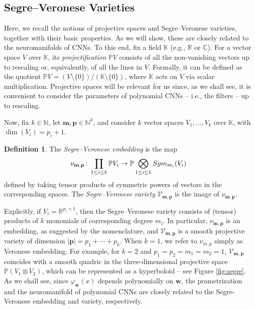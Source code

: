 \documentclass[twoside]{article}
\theoremstyle{plain}%
\theoremstyle{definition}
\newtheorem{defn}{Definition}
\theoremstyle{remark}
\newcommand{\symmm}[2]{\textnormal{Sym}_{#1}(#2)}
\begin{document}
\subsection{Segre--Veronese Varieties}
Here, we recall the notions of projective spaces and Segre--Veronese varieties, together with their basic properties. As we will show, these are closely related to the neuromanifolds of CNNs. To this end, fix a field $\mathbb{K}$ (e.g., $\mathbb{R}$ or $\mathbb{C}$). For a vector space $V$ over $\mathbb{K}$, its \emph{projectification} $\mathbb{P} V$ consists of all the non-vanishing vectors up to rescaling or, equivalently, of all the lines
in $V$. Formally, it can be defined as the quotient $\mathbb{P} V =(V \setminus \{ 0\}) / (\mathbb{K} \setminus \{ 0\})$, where $\mathbb{K}$ acts on $V$ via scalar multiplication. Projective spaces will be relevant for us since, as we shall see, it is convenient to consider the parameters of polynomial CNNs -- i.e., the filters -- up to rescaling. 

Now, fix $k \in \mathbb{N}$, let $\mathbf{m}, \mathbf{p} \in \mathbb{N}^k$, and consider $k$ vector spaces $V_1, \ldots, V_k$ over $\mathbb{K}$, with $\dim(V_i) = p_i + 1$. 

\begin{defn}\label{def:segveremb}
    The \emph{Segre--Veronese embedding} is the map
    \begin{equation}
        \nu_{\mathbf{m}, \mathbf{p}} \colon \prod_{1 \leq i \leq k}\mathbb{P}V_i \rightarrow \mathbb{P} \bigotimes_{1 \leq i \leq k} 
      \symmm{m_i}{V_i}  
    \end{equation}
defined by taking tensor products of symmetric powers of vectors in the corresponding spaces. The \emph{Segre--Veronese variety} $\mathcal{V}_{\mathbf{m}, \mathbf{p}}$ is the image of $ \nu_{\mathbf{m}, \mathbf{p}}$.
\end{defn}
Explicitly, if $V_i = \mathbb{R}^{p_i + 1}$, then the Segre--Veronese variety consists of (tensor) products of $k$ monomials of corresponding degree $m_i$. In particular, $ \nu_{\mathbf{m}, \mathbf{p}} $ is an embedding, as suggested by the nomenclature, and $\mathcal{V}_{\mathbf{m}, \mathbf{p}}$ is a smooth projective variety of dimension $| \mathbf{p}| = p_1 + \cdots +  p_{k}$. When $k=1$, we refer to $\nu_{m,p}$ simply as Veronese embedding. For example, for $k=2$ and $p_1 = p_2 = m_1 = m_2 = 1$, $\mathcal{V}_{\mathbf{m}, \mathbf{p}}$ coincides with a smooth quadric in the three-dimensional projective space $\mathbb{P}(V_1 \otimes V_2)$, which can be represented as a hyperboloid -- see Figure \ref{fig:segre}. As we shall see, since $\varphi_\mathbf{w}(x)$ depends polynomially on $\mathbf{w}$, the prametrization and the neuromanifold of polynomial CNNs are closely related to the Segre-Veronese embedding and variety, respectively. 
\end{document}
